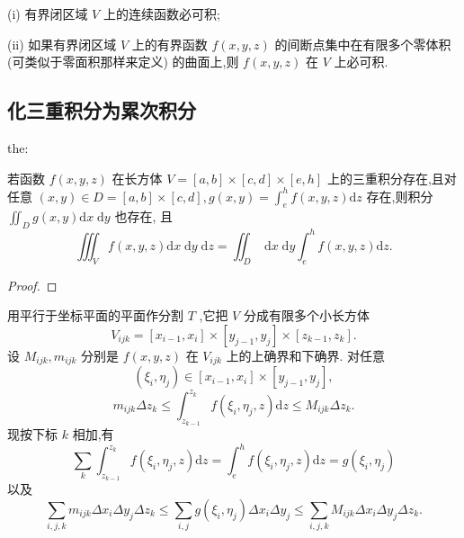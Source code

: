 (i) 有界闭区域 \(V\) 上的连续函数必可积;

(ii) 如果有界闭区域 \(V\) 上的有界函数 \(f\left( {x,y,z}\right)\) 的间断点集中在有限多个零体积 (可类似于零面积那样来定义) 的曲面上,则 \(f\left( {x,y,z}\right)\) 在 \(V\) 上必可积.

\subsection{化三重积分为累次积分}

\begin{theorem}{}{the:}

\end{theorem}
 若函数 \(f\left( {x,y,z}\right)\) 在长方体 \(V = \left\lbrack  {a,b}\right\rbrack   \times  \left\lbrack  {c,d}\right\rbrack   \times  \left\lbrack  {e,h}\right\rbrack\) 上的三重积分存在,且对任意 \(\left( {x,y}\right)  \in  D = \left\lbrack  {a,b}\right\rbrack   \times  \left\lbrack  {c,d}\right\rbrack  ,g\left( {x,y}\right)  = {\int }_{e}^{h}f\left( {x,y,z}\right) \mathrm{d}z\) 存在,则积分 \({\iint }_{D}g\left( {x,y}\right) \mathrm{d}x\mathrm{\;d}y\) 也存在, 且
\[
{\iiint }_{V}f\left( {x,y,z}\right) \mathrm{d}x\mathrm{\;d}y\mathrm{\;d}z = {\iint }_{D}\mathrm{\;d}x\mathrm{\;d}y{\int }_{e}^{h}f\left( {x,y,z}\right) \mathrm{d}z. \tag{1}
\]
\begin{proof}

\end{proof}
用平行于坐标平面的平面作分割 \(T\) ,它把 \(V\) 分成有限多个小长方体
\[
{V}_{ijk} = \left\lbrack  {{x}_{i - 1},{x}_{i}}\right\rbrack   \times  \left\lbrack  {{y}_{j - 1},{y}_{j}}\right\rbrack   \times  \left\lbrack  {{z}_{k - 1},{z}_{k}}\right\rbrack  .
\]
设 \({M}_{ijk},{m}_{ijk}\) 分别是 \(f\left( {x,y,z}\right)\) 在 \({V}_{ijk}\) 上的上确界和下确界. 对任意
\[
\left( {{\xi }_{i},{\eta }_{j}}\right)  \in  \left\lbrack  {{x}_{i - 1},{x}_{i}}\right\rbrack   \times  \left\lbrack  {{y}_{j - 1},{y}_{j}}\right\rbrack  ,
\]
\[
{m}_{ijk}\Delta {z}_{k} \leq  {\int }_{{z}_{k - 1}}^{{z}_{k}}f\left( {{\xi }_{i},{\eta }_{j},z}\right) \mathrm{d}z \leq  {M}_{ijk}\Delta {z}_{k}.
\]
现按下标 \(k\) 相加,有
\[
\mathop{\sum }\limits_{k}{\int }_{{z}_{k - 1}}^{{z}_{k}}f\left( {{\xi }_{i},{\eta }_{j},z}\right) \mathrm{d}z = {\int }_{e}^{h}f\left( {{\xi }_{i},{\eta }_{j},z}\right) \mathrm{d}z = g\left( {{\xi }_{i},{\eta }_{j}}\right)
\]
以及
\[
\mathop{\sum }\limits_{{i,j,k}}{m}_{ijk}\Delta {x}_{i}\Delta {y}_{j}\Delta {z}_{k} \leq  \mathop{\sum }\limits_{{i,j}}g\left( {{\xi }_{i},{\eta }_{j}}\right) \Delta {x}_{i}\Delta {y}_{j} \leq  \mathop{\sum }\limits_{{i,j,k}}{M}_{ijk}\Delta {x}_{i}\Delta {y}_{j}\Delta {z}_{k}. \tag{2}
\]
